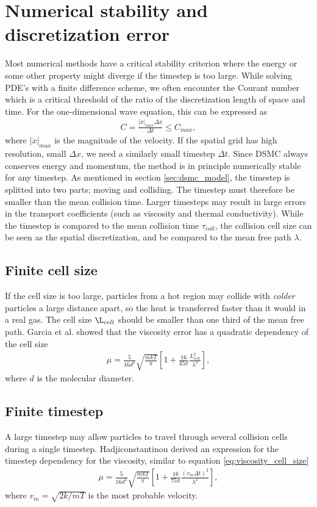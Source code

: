 \section{Numerical stability and discretization error}
\label{sec:dsmc_stability}
Most numerical methods have a critical stability criterion where the energy or some other property might diverge if the timestep is too large. While solving PDE's with a finite difference scheme, we often encounter the Courant number which is a critical threshold of the ratio of the discretization length of space and time. For the one-dimensional wave equation, this can be expressed as
\begin{align}
	C = \frac{|\dot x|_{max} \Delta x}{\Delta t} \leq C_{max},
\end{align}
where $|\dot x|_{max}$ is the magnitude of the velocity. If the spatial grid has high resolution, small $\Delta x$, we need a similarly small timestep $\Delta t$. Since DSMC always conserves energy and momentum, the method is in principle numerically stable for any timestep. As mentioned in section \ref{sec:dsmc_model}, the timestep is splitted into two parts; moving and colliding. The timestep must therefore be smaller than the mean collision time. Larger timesteps may result in large errors in the transport coefficients (such as viscosity and thermal conductivity)\cite{karniadakis2005microflows}. While the timestep is compared to the mean collision time $\tau_{coll}$, the collision cell size can be seen as the spatial discretization, and be compared to the mean free path $\lambda$. 
\subsection{Finite cell size}
If the cell size is too large, particles from a hot region may collide with \textit{colder} particles a large distance apart, so the heat is transferred faster than it would in a real gas. The cell size $\L_{cell}$ should be smaller than one third of the mean free path\cite{karniadakis2005microflows}. Garcia et al. \cite{alexander1998cell} showed that the viscosity error has a quadratic dependency of the cell size
\begin{align}
	\label{eq:viscosity_cell_size}
	\mu = \frac{5}{16d^2}\sqrt{\frac{mk T}{\pi}} \left [1 + \frac{16}{45\pi}\frac{L_{cell}^2}{\lambda^2}\right],
\end{align}
where $d$ is the molecular diameter. 
\subsection{Finite timestep}
A large timestep may allow particles to travel through several collision cells during a single timestep. Hadjiconstantinou \cite{hadjiconstantinou2000analysis} derived an expression for the timestep dependency for the viscosity, similar to equation \eqref{eq:viscosity_cell_size}
\begin{align}
	\mu = \frac{5}{16d^2}\sqrt{\frac{mk T}{\pi}} \left [1 + \frac{16}{75\pi}\frac{(v_m\Delta t)^2}{\lambda^2}\right],
\end{align}
where $v_m=\sqrt{2k/mT}$ is the most probable velocity. 